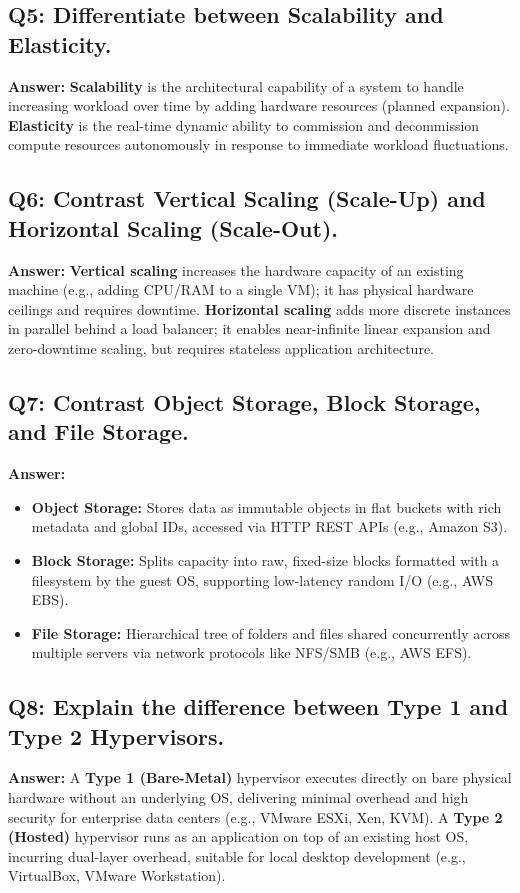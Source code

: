 \subsection*{Q5: Differentiate between Scalability and Elasticity.}
\textbf{Answer:} \textbf{Scalability} is the architectural capability of a system to handle increasing workload over time by adding hardware resources (planned expansion). \textbf{Elasticity} is the real-time dynamic ability to commission and decommission compute resources autonomously in response to immediate workload fluctuations.

\subsection*{Q6: Contrast Vertical Scaling (Scale-Up) and Horizontal Scaling (Scale-Out).}
\textbf{Answer:} \textbf{Vertical scaling} increases the hardware capacity of an existing machine (e.g., adding CPU/RAM to a single VM); it has physical hardware ceilings and requires downtime. \textbf{Horizontal scaling} adds more discrete instances in parallel behind a load balancer; it enables near-infinite linear expansion and zero-downtime scaling, but requires stateless application architecture.

\subsection*{Q7: Contrast Object Storage, Block Storage, and File Storage.}
\textbf{Answer:}
\begin{itemize}
    \item \textbf{Object Storage:} Stores data as immutable objects in flat buckets with rich metadata and global IDs, accessed via HTTP REST APIs (e.g., Amazon S3).
    \item \textbf{Block Storage:} Splits capacity into raw, fixed-size blocks formatted with a filesystem by the guest OS, supporting low-latency random I/O (e.g., AWS EBS).
    \item \textbf{File Storage:} Hierarchical tree of folders and files shared concurrently across multiple servers via network protocols like NFS/SMB (e.g., AWS EFS).
\end{itemize}

\subsection*{Q8: Explain the difference between Type 1 and Type 2 Hypervisors.}
\textbf{Answer:} A \textbf{Type 1 (Bare-Metal)} hypervisor executes directly on bare physical hardware without an underlying OS, delivering minimal overhead and high security for enterprise data centers (e.g., VMware ESXi, Xen, KVM). A \textbf{Type 2 (Hosted)} hypervisor runs as an application on top of an existing host OS, incurring dual-layer overhead, suitable for local desktop development (e.g., VirtualBox, VMware Workstation).

